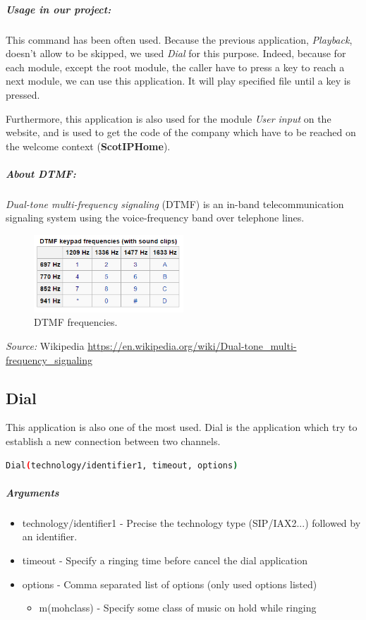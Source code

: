 \subparagraph{Usage in our project:}
This command has been often used. Because the previous application, \textit{Playback}, doesn't allow to be skipped, we used \textit{Dial} for this purpose. Indeed, because for each module, except the root module, the caller have to press a key to reach a next module, we can use this application. It will play specified file until a key is pressed. \newline

Furthermore, this application is also used for the module \textit{User input} on the website, and is used to get the code of the company which have to be reached on the welcome context (\textbf{ScotIPHome}). 


\subparagraph{About DTMF:}
\textit{Dual-tone multi-frequency signaling} (DTMF) is an in-band telecommunication signaling system using the voice-frequency band over telephone lines. 

\begin{figure}[!ht]
  \caption{DTMF frequencies.}
  \centering
    \includegraphics[width=0.5\textwidth]{img/dtmf.png}
\end{figure}

{\textit{Source:} Wikipedia} \url{https://en.wikipedia.org/wiki/Dual-tone_multi-frequency_signaling}
	


\subsection{Dial}
This application is also one of the most used. Dial is the application which try to establish a new connection between two channels. 



\begin{lstlisting}[language=bash,caption={Syntax of application Dial}]
Dial(technology/identifier1, timeout, options)
\end{lstlisting}

\subparagraph{Arguments}
\begin{itemize}

	\item technology/identifier1 - Precise the technology type (SIP/IAX2...) followed by an identifier. 
	\item timeout - Specify a ringing time before cancel the dial application
	\item options - Comma separated list of options (only used options listed)
	\begin{itemize}
		\item m(mohclass) - Specify some class of music on hold while ringing
	\end{itemize}
	
\end{itemize}

